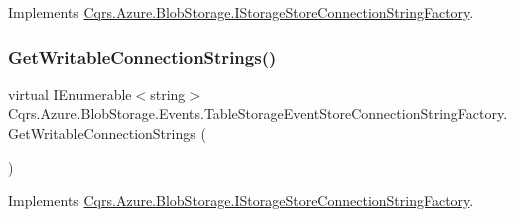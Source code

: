 Implements \hyperlink{interfaceCqrs_1_1Azure_1_1BlobStorage_1_1IStorageStoreConnectionStringFactory_a0ed836289e048767f753630bbcc98d5d_a0ed836289e048767f753630bbcc98d5d}{Cqrs.\+Azure.\+Blob\+Storage.\+I\+Storage\+Store\+Connection\+String\+Factory}.

\mbox{\label{classCqrs_1_1Azure_1_1BlobStorage_1_1Events_1_1TableStorageEventStoreConnectionStringFactory_a07406c2607bdd42dd13116b92fc6b665_a07406c2607bdd42dd13116b92fc6b665}} 
\subsubsection{\texorpdfstring{Get\+Writable\+Connection\+Strings()}{GetWritableConnectionStrings()}}
{\footnotesize\ttfamily virtual I\+Enumerable$<$string$>$ Cqrs.\+Azure.\+Blob\+Storage.\+Events.\+Table\+Storage\+Event\+Store\+Connection\+String\+Factory.\+Get\+Writable\+Connection\+Strings (\begin{DoxyParamCaption}{ }\end{DoxyParamCaption})\hspace{0.3cm}{\ttfamily [virtual]}}



Implements \hyperlink{interfaceCqrs_1_1Azure_1_1BlobStorage_1_1IStorageStoreConnectionStringFactory_a26ecfd0805fe3d525e9fa419330bd140_a26ecfd0805fe3d525e9fa419330bd140}{Cqrs.\+Azure.\+Blob\+Storage.\+I\+Storage\+Store\+Connection\+String\+Factory}.



